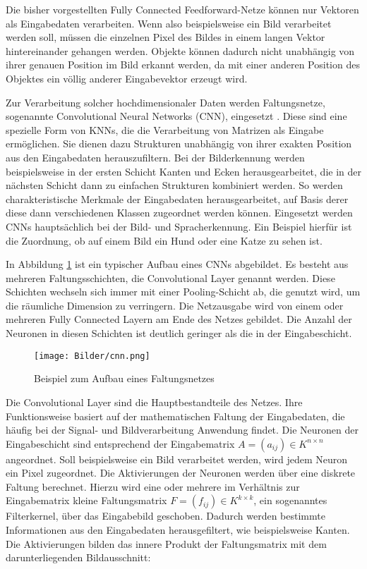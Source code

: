 Die bisher vorgestellten Fully Connected Feedforward-Netze können nur Vektoren als  Eingabedaten verarbeiten. Wenn also beispielsweise ein Bild verarbeitet werden soll, müssen die einzelnen Pixel des Bildes in einem langen Vektor hintereinander gehangen werden. Objekte können dadurch nicht unabhängig von ihrer genauen Position im Bild erkannt werden, da mit einer anderen Position des Objektes  ein völlig anderer Eingabevektor erzeugt wird. 

Zur Verarbeitung solcher hochdimensionaler Daten werden Faltungsnetze, sogenannte Convolutional Neural Networks (CNN), eingesetzt \cite{Li2020b}. Diese sind eine spezielle Form von KNNs, die die Verarbeitung von Matrizen als Eingabe ermöglichen. Sie dienen dazu Strukturen unabhängig von ihrer exakten Position aus den Ein\-ga\-be\-da\-ten herauszufiltern. Bei der Bilderkennung werden beispielsweise in der ersten Schicht Kanten und Ecken herausgearbeitet, die in der nächsten Schicht dann zu einfachen Strukturen kombiniert werden. So werden charakteristische Merkmale der Eingabedaten herausgearbeitet, auf Basis derer diese dann verschiedenen Klassen zugeordnet werden können. Eingesetzt werden CNNs hauptsächlich bei der Bild- und Spracherkennung. Ein Beispiel hierfür ist die Zuordnung, ob auf einem Bild ein Hund oder eine Katze zu sehen ist.

In Abbildung \ref{fig:aufbau-cnn} ist ein typischer Aufbau eines CNNs abgebildet. Es besteht aus mehreren Faltungsschichten, die Convolutional Layer genannt werden. Diese Schichten wechseln sich immer mit einer Pooling-Schicht ab, die genutzt wird, um die räumliche Dimension zu verringern. Die Netzausgabe wird von einem oder mehreren Fully Connected Layern am Ende des Netzes gebildet. Die Anzahl der Neuronen in diesen Schichten ist deutlich geringer als die in der Eingabeschicht. 

\begin{figure}
    \centering
    \texttt{[image: Bilder/cnn.png]}
    \caption{Beispiel zum Aufbau eines Faltungsnetzes}
    \label{fig:aufbau-cnn}
\end{figure}

Die Convolutional Layer sind die Hauptbestandteile des Netzes. Ihre Funk\-tions\-wei\-se basiert auf der mathematischen Faltung der Eingabedaten, die häufig bei der Signal- und Bildverarbeitung Anwendung findet. Die Neuronen der Eingabeschicht sind entsprechend der Eingabematrix $ A = (a_{ij}) \in K^{n \times n} $ angeordnet. Soll beispielsweise ein Bild verarbeitet werden, wird jedem Neuron ein Pixel zugeordnet. Die Aktivierungen der Neuronen werden über eine diskrete Faltung berechnet. Hierzu wird eine oder mehrere im Verhältnis zur Eingabematrix kleine Faltungsmatrix $ F = (f_{ij}) \in K^{k \times k} $, ein sogenanntes Filterkernel, über das Eingabebild geschoben. Dadurch werden bestimmte Informationen aus den Eingabedaten herausgefiltert, wie beispielsweise Kanten. Die Aktivierungen bilden das innere Produkt der Faltungsmatrix mit dem darunterliegenden Bildausschnitt: 

